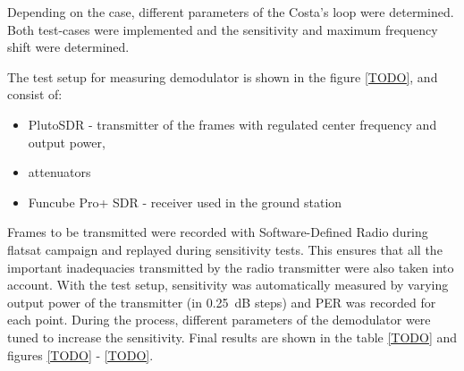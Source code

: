 Depending on the case, different parameters of the Costa's loop were determined. Both test-cases were implemented and the sensitivity and maximum frequency shift were determined.

The test setup for measuring demodulator is shown in the figure \ref{TODO}, and consist of:
\begin{itemize}
    \item PlutoSDR - transmitter of the frames with regulated center frequency and output power,
    \item attenuators
    \item Funcube Pro+ SDR - receiver used in the ground station
\end{itemize}

Frames to be transmitted were recorded with Software-Defined Radio during flatsat campaign and replayed during sensitivity tests. This ensures that all the important inadequacies transmitted by the radio transmitter were also taken into account.
With the test setup, sensitivity was automatically measured by varying output power of the transmitter (in \SI{0.25}{\dB} steps) and PER was recorded for each point. During the process, different parameters of the demodulator were tuned to increase the sensitivity. Final results are shown in the table \ref{TODO} and figures \ref{TODO} - \ref{TODO}.
